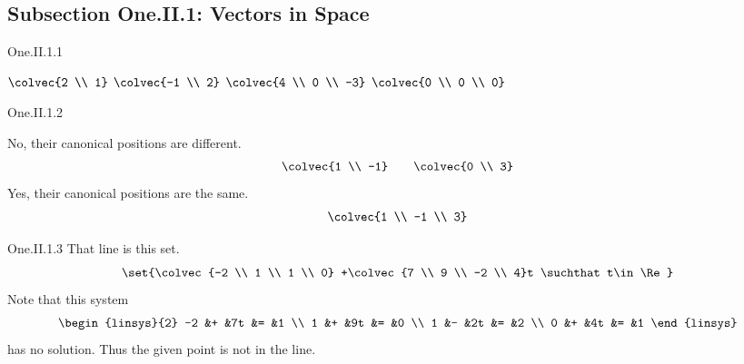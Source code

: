 \subsection{Subsection One.II.1: Vectors in Space}
\begin{ans}{One.II.1.1}
      \begin{exparts*}
        \partsitem \( \colvec{2 \\ 1}  \)
        \partsitem \( \colvec{-1 \\ 2}  \)
        \partsitem \( \colvec{4 \\ 0 \\ -3}  \)
        \partsitem \( \colvec{0 \\ 0 \\ 0}  \)
      \end{exparts*}
     
\end{ans}
\begin{ans}{One.II.1.2}
      \begin{exparts}
        \partsitem No, their canonical positions are different.
          \begin{equation*}
            \colvec{1 \\ -1}
            \qquad
            \colvec{0 \\ 3}
          \end{equation*}
        \partsitem Yes, their canonical positions are the same.
          \begin{equation*}
            \colvec{1 \\ -1 \\ 3}
          \end{equation*}
      \end{exparts}
     
\end{ans}
\begin{ans}{One.II.1.3}
      That line is this set.
      \begin{equation*}
        \set{\colvec{-2 \\ 1 \\ 1 \\ 0}
             +\colvec{7 \\ 9 \\ -2 \\ 4}t \suchthat t\in\Re }
      \end{equation*}
      Note that this system
      \begin{equation*}
        \begin{linsys}{2}
          -2  &+  &7t  &=  &1  \\
           1  &+  &9t  &=  &0  \\
           1  &-  &2t  &=  &2  \\
           0  &+  &4t  &=  &1
        \end{linsys}
      \end{equation*}
      has no solution.
      Thus the given point is not in the line.
    
\end{ans}
